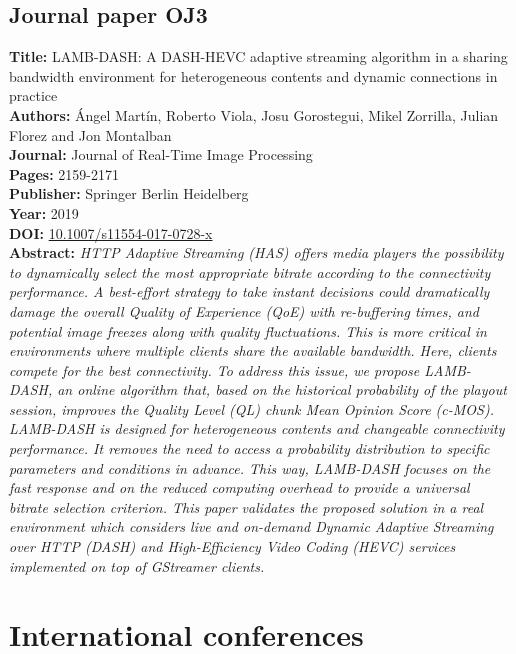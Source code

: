 \subsection{Journal paper OJ3}
\label{chap:RTIP2017}
\textbf{Title:} LAMB-DASH: A DASH-HEVC adaptive streaming algorithm in a sharing bandwidth environment for heterogeneous contents and dynamic connections in practice \\
\textbf{Authors:} \'Angel Mart\'in, Roberto Viola, Josu Gorostegui, Mikel Zorrilla, Julian Florez and Jon Montalban \\
\textbf{Journal:} Journal of Real-Time Image Processing \\
\textbf{Pages:} 2159-2171 \\
\textbf{Publisher:} Springer Berlin Heidelberg \\
\textbf{Year:} 2019 \\
\textbf{DOI:} \url{10.1007/s11554-017-0728-x} \\
\textbf{Abstract:} \textit{HTTP Adaptive Streaming (HAS) offers media players the possibility to dynamically select the most appropriate bitrate according to the connectivity performance. A best-effort strategy to take instant decisions could dramatically damage the overall Quality of Experience (QoE) with re-buffering times, and potential image freezes along with quality fluctuations. This is more critical in environments where multiple clients share the available bandwidth. Here, clients compete for the best connectivity. To address this issue, we propose LAMB-DASH, an online algorithm that, based on the historical probability of the playout session, improves the Quality Level (QL) chunk Mean Opinion Score (c-MOS). LAMB-DASH is designed for heterogeneous contents and changeable connectivity performance. It removes the need to access a probability distribution to specific parameters and conditions in advance. This way, LAMB-DASH focuses on the fast response and on the reduced computing overhead to provide a universal bitrate selection criterion. This paper validates the proposed solution in a real environment which considers live and on-demand Dynamic Adaptive Streaming over HTTP (DASH) and High-Efficiency Video Coding (HEVC) services implemented on top of GStreamer clients.} \\
\hrulefill

\section{International conferences}

